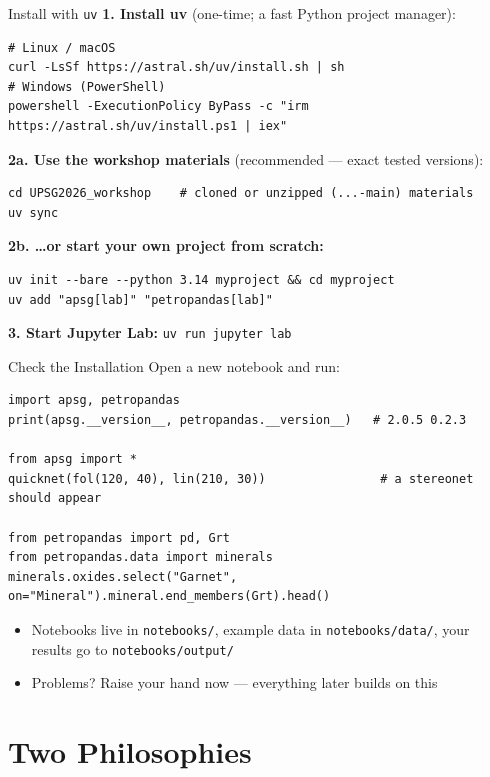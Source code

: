 \documentclass[aspectratio=169,11pt]{beamer}
\begin{document}
\begin{frame}[fragile]{Install with \texttt{uv}}
  \small
  \textbf{1. Install uv} (one-time; a fast Python project manager):
  \begin{lstlisting}[style=shell]
# Linux / macOS
curl -LsSf https://astral.sh/uv/install.sh | sh
# Windows (PowerShell)
powershell -ExecutionPolicy ByPass -c "irm https://astral.sh/uv/install.ps1 | iex"
  \end{lstlisting}
  \textbf{2a. Use the workshop materials} (recommended --- exact tested versions):
  \begin{lstlisting}[style=shell]
cd UPSG2026_workshop    # cloned or unzipped (...-main) materials
uv sync
  \end{lstlisting}
  \textbf{2b. \ldots or start your own project from scratch:}
  \begin{lstlisting}[style=shell]
uv init --bare --python 3.14 myproject && cd myproject
uv add "apsg[lab]" "petropandas[lab]"
  \end{lstlisting}
  \textbf{3. Start Jupyter Lab:} \texttt{uv run jupyter lab}
\end{frame}

\begin{frame}[fragile]{Check the Installation}
  Open a new notebook and run:
  \begin{lstlisting}[style=python]
import apsg, petropandas
print(apsg.__version__, petropandas.__version__)   # 2.0.5 0.2.3

from apsg import *
quicknet(fol(120, 40), lin(210, 30))                # a stereonet should appear

from petropandas import pd, Grt
from petropandas.data import minerals
minerals.oxides.select("Garnet", on="Mineral").mineral.end_members(Grt).head()
  \end{lstlisting}
  \vspace{0.2cm}
  \small
  \begin{itemize}
    \item Notebooks live in \texttt{notebooks/}, example data in \texttt{notebooks/data/},
          your results go to \texttt{notebooks/output/}
    \item Problems? Raise your hand now --- everything later builds on this
  \end{itemize}
\end{frame}

\section{Two Philosophies}
\end{document}
